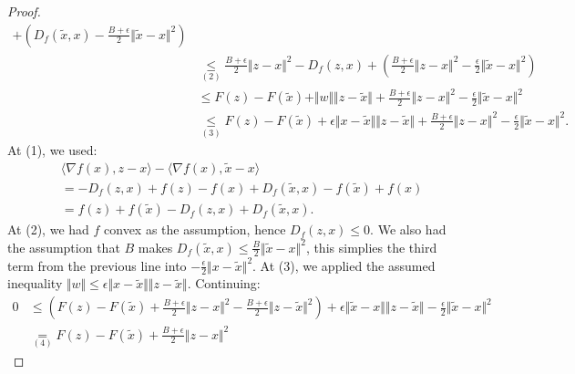 \documentclass[12pt]{article}
\begin{document}
\begin{proof}
\begin{align*}
                + \left(
                    D_f(\tilde x, x)
                    - \frac{B + \epsilon}{2}\Vert \tilde x - x\Vert^2
                \right)
            \\
            &\underset{(2)}{\le} 
            \frac{B + \epsilon}{2}\Vert z - x\Vert^2 - D_f(z, x)
            + \left(
                \frac{B + \epsilon}{2}\Vert z - x\Vert^2
                - \frac{\epsilon}{2}\Vert \tilde x - x\Vert^2
            \right)
            \\
            &\le
            F(z) - F(\tilde x) + \Vert w \Vert\Vert z - \tilde x\Vert
            + \frac{B + \epsilon}{2}\Vert z - x\Vert^2
            - \frac{\epsilon}{2}\Vert \tilde x - x\Vert^2
            \\
            &\underset{(3)}{\le}
            F(z) - F(\tilde x) 
            + \epsilon\Vert x - \tilde x\Vert\Vert z - \tilde x\Vert
            + \frac{B + \epsilon}{2}\Vert z - x\Vert^2
            - \frac{\epsilon}{2}\Vert \tilde x - x\Vert^2. 
        \end{align*}
        At (1), we used: 
        \begin{align*}
            & \langle \nabla f(x), z - x\rangle
            - \langle \nabla f(x), \tilde x - x\rangle
            \\
            &= 
            - D_f(z, x) + f(z) - f(x)
            + D_f(\tilde x, x) - f(\tilde x) + f(x)
            \\
            &= f(z) + f(\tilde x) - D_f(z, x) + D_f(\tilde x , x). 
        \end{align*}
        At (2), we had $f$ convex as the assumption, hence $D_f(z, x) \le 0$. 
        We also had the assumption that $B$ makes $D_f(\tilde x, x) \le \frac{B}{2}\Vert \tilde x - x\Vert^2$, this simplies the third term from the previous line into $- \frac{\epsilon}{2}\Vert x - \tilde x\Vert^2$. 
        At (3), we applied the assumed inequality $\Vert w\Vert \le \epsilon \Vert x - \tilde x\Vert \Vert z - \tilde x\Vert$. 
        Continuing: 
        \begin{align*}
            0 &\le
            \left(
                F(z) - F(\tilde x) + \frac{B + \epsilon}{2}\Vert z - x\Vert^2
                - \frac{B + \epsilon}{2}\Vert z - \tilde x\Vert^2 
            \right)
            + \epsilon \Vert \tilde x - x\Vert \Vert z - \tilde x\Vert
            - \frac{\epsilon}{2}\Vert \tilde x - x\Vert^2
            \\
            &\underset{(4)}{=} 
            F(z) - F(\tilde x) + \frac{B + \epsilon}{2}\Vert z - x\Vert^2

\end{align*}
\end{proof}
\end{document}

